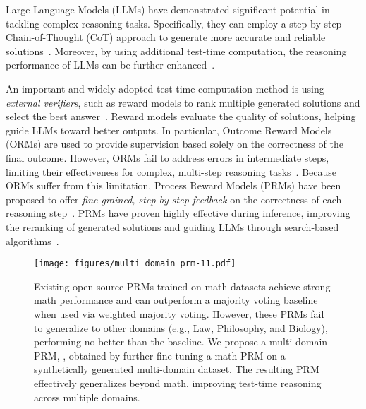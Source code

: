 

Large Language Models (LLMs) have demonstrated significant potential in tackling complex reasoning tasks.
Specifically,
they can employ a step-by-step Chain-of-Thought (CoT) approach to generate more accurate and reliable solutions~\citep{wei2022chain,NEURIPS2022_8bb0d291,yao2023react,NEURIPS2023_91edff07}.
Moreover, by using additional test-time computation, the reasoning performance of LLMs can be further enhanced~\citep{snell2024scaling,yao2024tree}.


An important and widely-adopted test-time computation method is using \emph{external verifiers},
such as reward models to rank multiple generated solutions and select the best answer~\citep{lightman2023let}.
Reward models evaluate the quality of solutions, helping guide LLMs toward better outputs.
In particular,
Outcome Reward Models (ORMs) are used to provide supervision based solely on the correctness of the final outcome.
However,
ORMs fail to address errors in intermediate steps,
limiting their effectiveness for complex, multi-step reasoning tasks~\citep{luo2024improve,lightman2023let, sun2024easy}.
Because ORMs suffer from this limitation, 
Process Reward Models (PRMs) have been proposed to offer
\emph{fine-grained, step-by-step feedback} on the correctness of each reasoning step~\citep{lightman2023let,uesato2022solving}.
PRMs have proven highly effective during inference, improving the reranking of generated solutions and guiding LLMs through search-based algorithms~\citep{feng2023alphazero,wang2024openr}.




\begin{figure*}[t]
    \begin{center}
        \texttt{[image: figures/multi\_domain\_prm-11.pdf]}        
        \caption{
        Existing open-source PRMs trained on math datasets achieve strong math performance and can outperform a majority voting baseline when used via weighted majority voting. However, these PRMs fail to generalize to other domains (e.g., Law, Philosophy, and Biology), performing no better than the baseline. We propose a multi-domain PRM, \ourprm, obtained by further fine-tuning a math PRM on a synthetically generated multi-domain dataset. The resulting PRM effectively generalizes  beyond math, improving test-time reasoning across multiple domains.
        }
        \label{fig:math-prm-bad}
    \end{center}
    \vskip -0.2in
\end{figure*}


